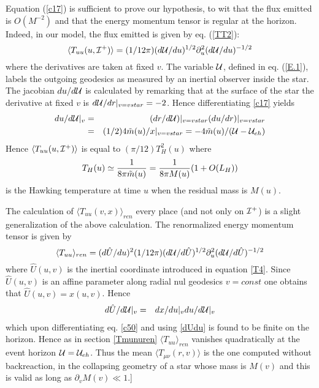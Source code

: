 \documentclass[12pt,oneside]{report}
\begin{document}
Equation (\ref{c17}) is sufficient to prove  our hypothesis, to
wit that the flux emitted is $O(M^{-2})$ and that the energy momentum tensor is
regular at the horizon. Indeed, in our model,
 the flux emitted is given by eq. (\ref{TT2}):  
\begin{equation}
\langle T_{uu} (u,{\cal I}^+)\rangle=
(1/12 \pi) (d{\cal U}/du)^{1/2}\partial_u^2(d{\cal U}/du)^{-1/2}
\label{c50}
\end{equation}
  where the derivatives are taken at fixed $v$. The variable ${\cal U}$, defined
in eq. (\ref{E.1}), labels the outgoing geodesics as measured by an inertial
observer inside the star. The  jacobian $du/d{\cal U}$
is calculated by remarking that at the surface of the star the derivative at
fixed $v$ is 
$d{\cal U}/dr\vert_{v=vstar} = -2$. Hence  differentiating \ref{c17} yields
\begin{eqnarray}
du/d{\cal
U}\vert_v &=&(dr/d{\cal U})\vert_{v=vstar}( du/ dr)\vert_{v=vstar}\nonumber\\
&=& (1/2)4 \tilde m(u) /
x\vert_{v=vstar}= -4 \tilde m(u) / ({\cal U}-{\cal U}_{eh})
\label{dUdu}
\end{eqnarray}
Hence $\langle T_{uu} (u,{\cal I}^+)\rangle$ is equal to $(\pi /
12) T_H^2(u)$ where \begin{equation}
T_H(u) \simeq {1 \over 8 \pi \tilde m(u) }= {1\over 8 \pi M(u)} (1 +
O(L_H))
\end{equation}
is the Hawking temperature at time $u$ when the residual mass
is $M(u)$. 

The calculation of $\langle T_{uu}(v,x)\rangle_{ren}$ every place
(and not only on ${\cal I}^+$) is a slight generalization of the above
calculation. The renormalized energy momentum
tensor is given by 
\begin{equation}
\langle T_{uu} \rangle_{ren} =(d \hat U/ du)^2
(1/12 \pi) (d{\cal U}/d\hat U)^{1/2}\partial_u^2(d{\cal U}/d\hat U)^{-1/2}
\end{equation}
where  $\hat U(u, v)$ is the inertial coordinate introduced in equation
\ref{T4}. Since  $\hat U(u, v)$ is an affine parameter along
radial nul geodesics $v=const$ one obtains that $\hat U(u, v) = x(u,v)$. Hence
\begin{eqnarray}
d \hat U / d{\cal U}\vert_v &=&
d x / d{u}\vert_v d u / d{\cal U}\vert_v
\end{eqnarray}
which upon differentiating eq. \ref{c50} and using \ref{dUdu} is found to be
finite on the horizon. Hence as in section \ref{Tmunuren}  $\langle T_{uu}
\rangle_{ren}$ vanishes quadratically at the event horizon
${\cal U}={\cal U}_{eh}$. Thus the mean
$\langle T_{\mu \nu} (r,v)\rangle$ is the one computed without backreaction, in
the collapsing geometry of a star whose mass is $M(v)$ and this is valid
as long as $\partial_v M(v)  \ll 1 $.]
\end{document}
